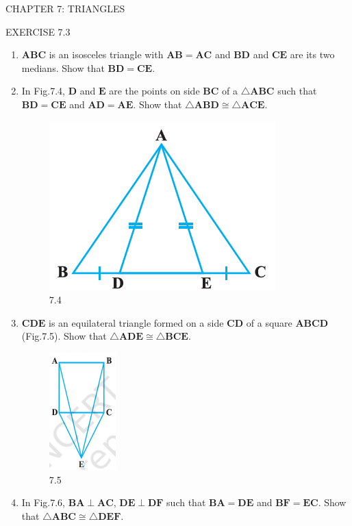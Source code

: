\documentclass{article}
\let\vec\mathbf
\begin{document}
\begin{center}
	\color{blue} CHAPTER 7: TRIANGLES
\end{center}
\begin{center}
	\color{blue} EXERCISE 7.3
\end{center}

\begin{enumerate}
	\item $\vec{ABC}$ is an isosceles triangle with $\vec{AB=AC}$ and $\vec{BD}$ and $\vec{CE}$ are its two medians. Show that $\vec{BD=CE}$.
	\item In Fig.7.4, $\vec{D}$ and $\vec{E}$ are the points on side $\vec{BC}$ of a $\triangle \vec{ABC}$ such that $\vec{BD=CE}$ and $\vec{AD=AE}$. Show that $\triangle \vec{ABD} \cong \triangle \vec{ACE}$.
\begin{figure}[h]
	\centering
	\includegraphics[width=0.3\columnwidth]{figs/Figure1.png}
	\caption{7.4}
	\label{}
\end{figure}
\item $\vec{CDE}$ is an equilateral triangle formed on a side $\vec{CD}$ of a square $\vec{ABCD}$ (Fig.7.5). Show that $\triangle \vec{ADE} \cong \triangle \vec{BCE}$.
\begin{figure}[h]
	\centering
	\includegraphics[width=0.3\columnwidth]{figs/Figure2.png}
	\caption{7.5}
	\label{}
\end{figure}
\item In Fig.7.6, $\vec{BA} \perp \vec{AC}$, $\vec{DE} \perp \vec{DF}$ such that $\vec{BA=DE}$ and $\vec{BF=EC}$. Show that $\triangle \vec{ABC} \cong \triangle \vec{DEF}$.

\end{enumerate}
\end{document}
